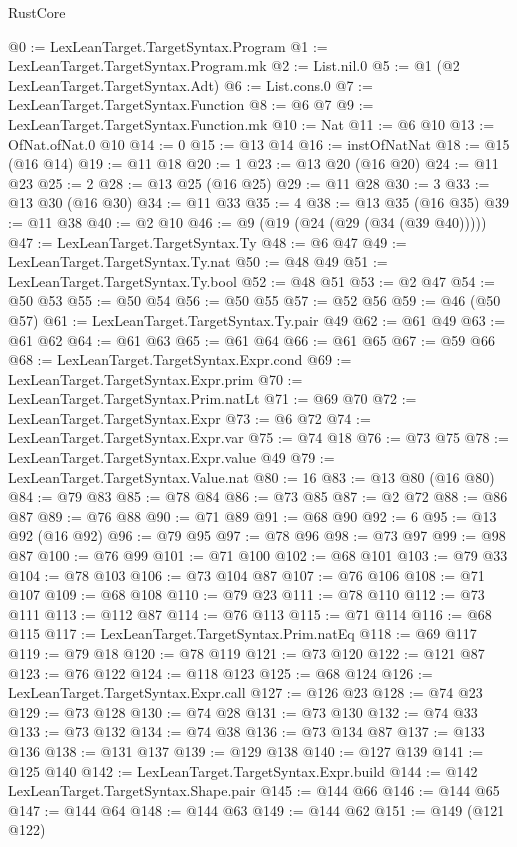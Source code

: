 \begin{lexlean}{RustCore}
\begin{coremodule}
@0 := LexLeanTarget.TargetSyntax.Program
@1 := LexLeanTarget.TargetSyntax.Program.mk
@2 := List.nil.{0}
@5 := @1 (@2 LexLeanTarget.TargetSyntax.Adt)
@6 := List.cons.{0}
@7 := LexLeanTarget.TargetSyntax.Function
@8 := @6 @7
@9 := LexLeanTarget.TargetSyntax.Function.mk
@10 := Nat
@11 := @6 @10
@13 := OfNat.ofNat.{0} @10
@14 := 0
@15 := @13 @14
@16 := instOfNatNat
@18 := @15 (@16 @14)
@19 := @11 @18
@20 := 1
@23 := @13 @20 (@16 @20)
@24 := @11 @23
@25 := 2
@28 := @13 @25 (@16 @25)
@29 := @11 @28
@30 := 3
@33 := @13 @30 (@16 @30)
@34 := @11 @33
@35 := 4
@38 := @13 @35 (@16 @35)
@39 := @11 @38
@40 := @2 @10
@46 := @9 (@19 (@24 (@29 (@34 (@39 @40)))))
@47 := LexLeanTarget.TargetSyntax.Ty
@48 := @6 @47
@49 := LexLeanTarget.TargetSyntax.Ty.nat
@50 := @48 @49
@51 := LexLeanTarget.TargetSyntax.Ty.bool
@52 := @48 @51
@53 := @2 @47
@54 := @50 @53
@55 := @50 @54
@56 := @50 @55
@57 := @52 @56
@59 := @46 (@50 @57)
@61 := LexLeanTarget.TargetSyntax.Ty.pair @49
@62 := @61 @49
@63 := @61 @62
@64 := @61 @63
@65 := @61 @64
@66 := @61 @65
@67 := @59 @66
@68 := LexLeanTarget.TargetSyntax.Expr.cond
@69 := LexLeanTarget.TargetSyntax.Expr.prim
@70 := LexLeanTarget.TargetSyntax.Prim.natLt
@71 := @69 @70
@72 := LexLeanTarget.TargetSyntax.Expr
@73 := @6 @72
@74 := LexLeanTarget.TargetSyntax.Expr.var
@75 := @74 @18
@76 := @73 @75
@78 := LexLeanTarget.TargetSyntax.Expr.value @49
@79 := LexLeanTarget.TargetSyntax.Value.nat
@80 := 16
@83 := @13 @80 (@16 @80)
@84 := @79 @83
@85 := @78 @84
@86 := @73 @85
@87 := @2 @72
@88 := @86 @87
@89 := @76 @88
@90 := @71 @89
@91 := @68 @90
@92 := 6
@95 := @13 @92 (@16 @92)
@96 := @79 @95
@97 := @78 @96
@98 := @73 @97
@99 := @98 @87
@100 := @76 @99
@101 := @71 @100
@102 := @68 @101
@103 := @79 @33
@104 := @78 @103
@106 := @73 @104 @87
@107 := @76 @106
@108 := @71 @107
@109 := @68 @108
@110 := @79 @23
@111 := @78 @110
@112 := @73 @111
@113 := @112 @87
@114 := @76 @113
@115 := @71 @114
@116 := @68 @115
@117 := LexLeanTarget.TargetSyntax.Prim.natEq
@118 := @69 @117
@119 := @79 @18
@120 := @78 @119
@121 := @73 @120
@122 := @121 @87
@123 := @76 @122
@124 := @118 @123
@125 := @68 @124
@126 := LexLeanTarget.TargetSyntax.Expr.call
@127 := @126 @23
@128 := @74 @23
@129 := @73 @128
@130 := @74 @28
@131 := @73 @130
@132 := @74 @33
@133 := @73 @132
@134 := @74 @38
@136 := @73 @134 @87
@137 := @133 @136
@138 := @131 @137
@139 := @129 @138
@140 := @127 @139
@141 := @125 @140
@142 := LexLeanTarget.TargetSyntax.Expr.build
@144 := @142 LexLeanTarget.TargetSyntax.Shape.pair
@145 := @144 @66
@146 := @144 @65
@147 := @144 @64
@148 := @144 @63
@149 := @144 @62
@151 := @149 (@121 @122)

\end{coremodule}
\end{lexlean}
